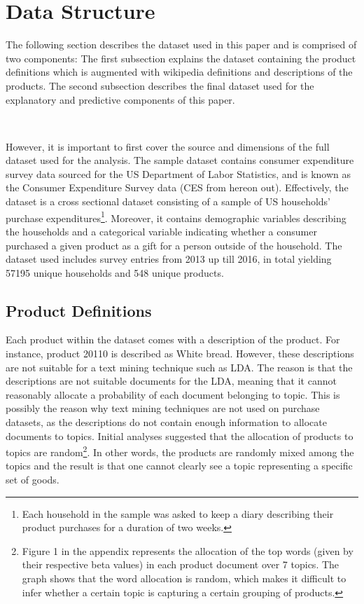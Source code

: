 \section{Data Structure} %
\label{sub:data_structure}
 
The following section describes the dataset used in this paper and is comprised of two components: The first subsection explains the dataset containing the product definitions which is augmented with wikipedia definitions and descriptions of the products. The second subsection describes the final dataset used for the explanatory and predictive components of this paper. 

\

However, it is important to first cover the source and dimensions of the full dataset used for the analysis. The sample dataset contains consumer expenditure survey data sourced for the US Department of Labor Statistics, and is known as the Consumer Expenditure Survey data (CES from hereon out). Effectively, the dataset is a cross sectional dataset consisting of a sample of US households' purchase expenditures\footnote{Each household in the sample was asked to keep a diary describing their product purchases for a duration of two weeks.}. Moreover, it contains demographic variables describing the households and a categorical variable indicating whether a consumer purchased a given product as a gift for a person outside of the household. The dataset used includes survey entries from 2013 up till 2016, in total yielding 57195 unique households and 548 unique products. 

\subsection{Product Definitions} %
\label{sub:product_definitions}

Each product within the dataset comes with a description of the product. For instance, product 20110 is described as White bread. However, these descriptions are not suitable for a text mining technique such as LDA. The reason is that the descriptions are not suitable documents for the LDA, meaning that it cannot reasonably allocate a probability of each document belonging to topic. This is possibly the reason why text mining techniques are not used on purchase datasets, as the descriptions do not contain enough information to allocate documents to topics. Initial analyses suggested that the allocation of products to topics are random\footnote{Figure 1 in the appendix represents the allocation of the top words (given by their respective beta values) in each product document over 7 topics. The graph shows that the word allocation is random, which makes it difficult to infer whether a certain topic is capturing a certain grouping of products.}. In other words, the products are randomly mixed among the topics and the result is that one cannot clearly see a topic representing a specific set of goods. 

